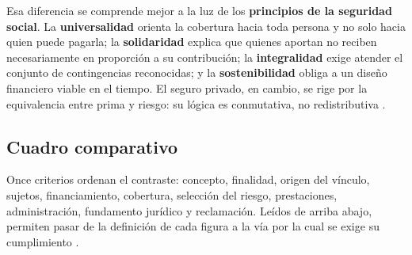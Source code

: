 \documentclass[12pt,letterpaper,oneside]{article}
\begin{document}
Esa diferencia se comprende mejor a la luz de los \textbf{principios de la seguridad social}. La \textbf{universalidad} orienta la cobertura hacia toda persona y no solo hacia quien puede pagarla; la \textbf{solidaridad} explica que quienes aportan no reciben necesariamente en proporci\'on a su contribuci\'on; la \textbf{integralidad} exige atender el conjunto de contingencias reconocidas; y la \textbf{sostenibilidad} obliga a un dise\~no financiero viable en el tiempo. El seguro privado, en cambio, se rige por la equivalencia entre prima y riesgo: su l\'ogica es conmutativa, no redistributiva \citep{perezSotoCalderon2012,belmontParra2017,idcRodriguez2019}.

\subsection{Cuadro comparativo}

Once criterios ordenan el contraste: concepto, finalidad, origen del v\'inculo, sujetos, financiamiento, cobertura, selecci\'on del riesgo, prestaciones, administraci\'on, fundamento jur\'idico y reclamaci\'on. Le\'idos de arriba abajo, permiten pasar de la definici\'on de cada figura a la v\'ia por la cual se exige su cumplimiento \citep{bricenoRuiz2011,lss2026,leyContratoSeguro2026}.
\end{document}
